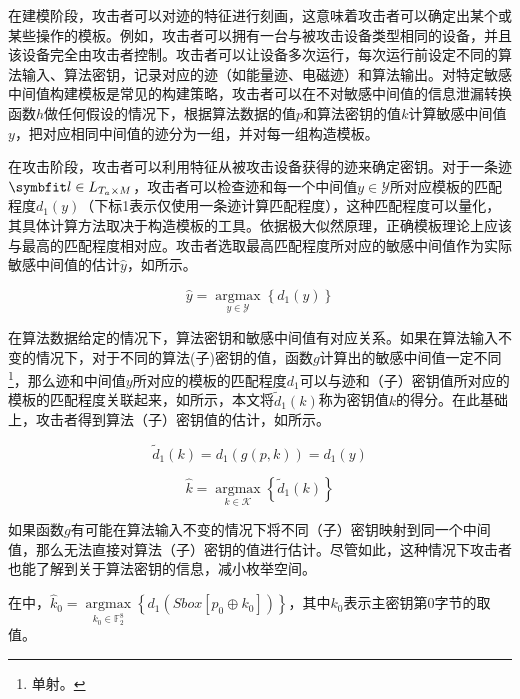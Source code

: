 {	在建模阶段，攻击者可以对迹的特征进行刻画，这意味着攻击者可以确定出某个或某些操作的模板。例如，攻击者可以拥有一台与被攻击设备类型相同的设备，并且该设备完全由攻击者控制。攻击者可以让设备多次运行，每次运行前设定不同的算法输入、算法密钥，记录对应的迹（如能量迹、电磁迹）和算法输出。对特定敏感中间值构建模板是常见的构建策略，攻击者可以在不对敏感中间值的信息泄漏转换函数$h$做任何假设的情况下，根据算法数据的值$p$和算法密钥的值$k$计算敏感中间值$y$，把对应相同中间值的迹分为一组，并对每一组构造模板。
	
	在攻击阶段，攻击者可以利用特征从被攻击设备获得的迹来确定密钥。对于一条迹$\Vector l\in L_{T_a\times M}$，攻击者可以检查迹和每一个中间值$y\in\mathcal Y$所对应模板的匹配程度$d_1(y)$（下标1表示仅使用一条迹计算匹配程度），这种匹配程度可以量化，其具体计算方法取决于构造模板的工具。依据极大似然原理，正确模板理论上应该与最高的匹配程度相对应\citep{Kay1998}。攻击者选取最高匹配程度所对应的敏感中间值作为实际敏感中间值的估计$\hat y$，如所示。
	
	\begin{equation}\label{eq:1tracey}
		\hat y=\mathop{\mathrm{argmax}}\limits_{y\in\mathcal Y}\left\lbrace d_1(y)\right\rbrace
	\end{equation}
	
	在算法数据给定的情况下，算法密钥和敏感中间值有对应关系。如果在算法输入不变的情况下，对于不同的算法(子)密钥的值，函数$g$计算出的敏感中间值一定不同\footnote{单射。}，那么迹和中间值$y$所对应的模板的匹配程度$d_1$可以与迹和（子）密钥值所对应的模板的匹配程度关联起来，如所示，本文将$\tilde d_1(k)$称为密钥值$k$的得分。在此基础上，攻击者得到算法（子）密钥值的估计，如所示。
	
	\begin{equation}\label{eq:gsup-1}
		\tilde d_1(k)=d_1\left(g(p,k) \right)=d_1(y)
	\end{equation}
	
	\begin{equation}\label{eq:1tracek}
		\hat k=\mathop{\mathrm{argmax}}\limits_{k\in\mathcal K}\left\lbrace \tilde d_1(k)\right\rbrace 
	\end{equation}
	
	如果函数$g$有可能在算法输入不变的情况下将不同（子）密钥映射到同一个中间值，那么无法直接对算法（子）密钥的值进行估计。尽管如此，这种情况下攻击者也能了解到关于算法密钥的信息，减小枚举空间。
	
	\begin{example}
		在中，$\hat k_0=\mathop{\mathrm{argmax}}\limits_{k_0\in\mathbb F_2^8}\left\lbrace d_1\left(Sbox\left[p_0\oplus k_0\right]\right)\right\rbrace $，其中$k_0$表示主密钥第0字节的取值。
	\end{example}

}
